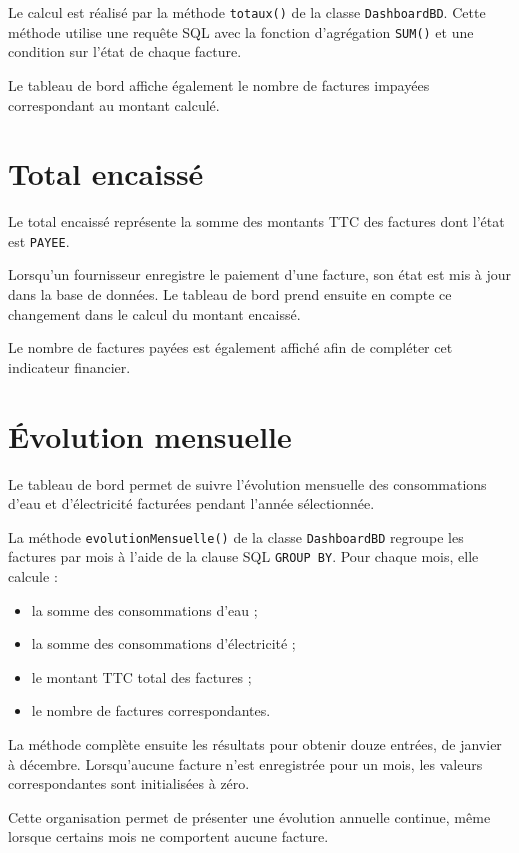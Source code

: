 Le calcul est réalisé par la méthode \texttt{totaux()} de la classe \texttt{DashboardBD}. Cette méthode utilise une requête SQL avec la fonction d'agrégation \texttt{SUM()} et une condition sur l'état de chaque facture.

Le tableau de bord affiche également le nombre de factures impayées correspondant au montant calculé.

\section{Total encaissé}

Le total encaissé représente la somme des montants TTC des factures dont l'état est \texttt{PAYEE}.

Lorsqu'un fournisseur enregistre le paiement d'une facture, son état est mis à jour dans la base de données. Le tableau de bord prend ensuite en compte ce changement dans le calcul du montant encaissé.

Le nombre de factures payées est également affiché afin de compléter cet indicateur financier.

\section{Évolution mensuelle}

Le tableau de bord permet de suivre l'évolution mensuelle des consommations d'eau et d'électricité facturées pendant l'année sélectionnée.

La méthode \texttt{evolutionMensuelle()} de la classe \texttt{DashboardBD} regroupe les factures par mois à l'aide de la clause SQL \texttt{GROUP BY}. Pour chaque mois, elle calcule :

\begin{itemize}
    \item la somme des consommations d'eau ;
    \item la somme des consommations d'électricité ;
    \item le montant TTC total des factures ;
    \item le nombre de factures correspondantes.
\end{itemize}

La méthode complète ensuite les résultats pour obtenir douze entrées, de janvier à décembre. Lorsqu'aucune facture n'est enregistrée pour un mois, les valeurs correspondantes sont initialisées à zéro.

Cette organisation permet de présenter une évolution annuelle continue, même lorsque certains mois ne comportent aucune facture.

